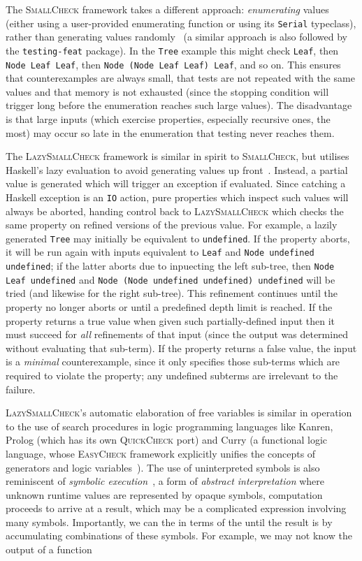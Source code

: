The \textsc{SmallCheck} framework takes a different approach: \emph{enumerating}
values (either using a user-provided enumerating function or using its
\texttt{Serial} typeclass), rather than generating values
randomly~\cite{runciman2008smallcheck} (a similar approach is also followed by
the \texttt{testing-feat} package). In the \texttt{Tree} example this might
check \texttt{Leaf}, then \texttt{Node Leaf Leaf}, then
\texttt{Node (Node Leaf Leaf) Leaf}, and so on. This ensures that
counterexamples are always small, that tests are not repeated with the same
values and that memory is not exhausted (since the stopping condition will
trigger long before the enumeration reaches such large values). The disadvantage
is that large inputs (which exercise properties, especially recursive ones, the
most) may occur so late in the enumeration that testing never reaches them.

The \textsc{LazySmallCheck} framework is similar in spirit to
\textsc{SmallCheck}, but utilises Haskell's lazy evaluation to avoid generating
values up front~\cite{reich2013advances}. Instead, a partial value is generated
which will trigger an exception if evaluated. Since catching a Haskell exception
is an \texttt{IO} action, pure properties which inspect such values will always
be aborted, handing control back to \textsc{LazySmallCheck} which checks the
same property on refined versions of the previous value. For example, a lazily
generated \texttt{Tree} may initially be equivalent to \texttt{undefined}. If
the property aborts, it will be run again with inputs equivalent to
\texttt{Leaf}
and \texttt{Node undefined undefined}; if the latter aborts due to inpuecting
the left sub-tree, then \texttt{Node Leaf undefined} and
\texttt{Node (Node undefined undefined) undefined} will be tried (and likewise
for the right sub-tree). This refinement continues until the property no longer
aborts or until a predefined depth limit is reached. If the property returns a
true value when given such partially-defined input then it must succeed for
\emph{all} refinements of that input (since the output was determined without
evaluating that sub-term). If the property returns a false value, the input is a
\emph{minimal} counterexample, since it only specifies those sub-terms which are
required to violate the property; any undefined subterms are irrelevant to the
failure.

\textsc{LazySmallCheck}'s automatic elaboration of free variables is similar in
operation to the use of search procedures in logic programming languages like
Kanren, Prolog (which has its own \textsc{QuickCheck} port) and Curry (a
functional logic language, whose \textsc{EasyCheck} framework explicitly
unifies the concepts of generators and logic
variables~\cite{christiansen2008easycheck}). The use of uninterpreted symbols
is also reminiscent of \emph{symbolic execution}~\cite{}, a form of
\emph{abstract interpretation} where unknown runtime values are represented by
opaque symbols, computation proceeds to arrive at a result, which may be a
complicated expression involving many symbols. Importantly, we can  the in terms of the until the result is
by accumulating
combinations of these symbols. For example, we may not know the output of a function
